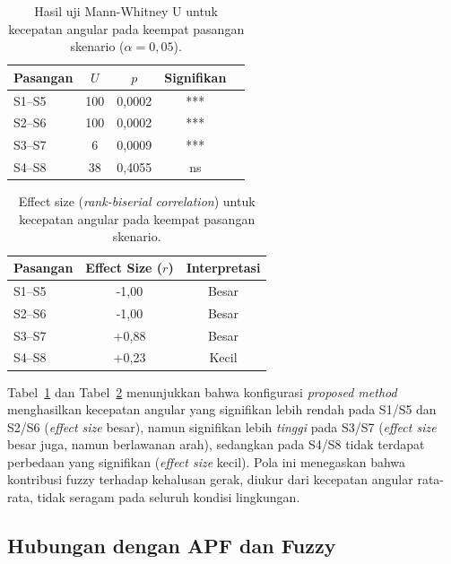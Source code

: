 \begin{table}[H]
\centering
\caption{Hasil uji Mann-Whitney U untuk kecepatan angular pada keempat
pasangan skenario ($\alpha=0,05$).}
\label{tab:angvel_mwu}
\begin{tabular}{lcccc}
\toprule
\textbf{Pasangan} & \textbf{$U$} & \textbf{$p$} & \textbf{Signifikan} \\
\midrule
S1--S5 & 100 & 0,0002 & *** \\
S2--S6 & 100 & 0,0002 & *** \\
S3--S7 & 6   & 0,0009 & *** \\
S4--S8 & 38  & 0,4055 & ns  \\
\bottomrule
\end{tabular}
\end{table}

\begin{table}[H]
\centering
\caption{Effect size (\textit{rank-biserial correlation}) untuk kecepatan
angular pada keempat pasangan skenario.}
\label{tab:angvel_effect_size}
\begin{tabular}{lcc}
\toprule
\textbf{Pasangan} & \textbf{Effect Size ($r$)} & \textbf{Interpretasi} \\
\midrule
S1--S5 & -1,00 & Besar \\
S2--S6 & -1,00 & Besar \\
S3--S7 & +0,88 & Besar \\
S4--S8 & +0,23 & Kecil \\
\bottomrule
\end{tabular}
\end{table}

Tabel~\ref{tab:angvel_mwu} dan Tabel~\ref{tab:angvel_effect_size}
menunjukkan bahwa konfigurasi \textit{proposed method} menghasilkan
kecepatan angular yang signifikan lebih rendah pada S1/S5 dan S2/S6
(\textit{effect size} besar), namun signifikan lebih \textit{tinggi} pada
S3/S7 (\textit{effect size} besar juga, namun berlawanan arah), sedangkan
pada S4/S8 tidak terdapat perbedaan yang signifikan (\textit{effect size}
kecil). Pola ini menegaskan bahwa kontribusi fuzzy terhadap kehalusan gerak,
diukur dari kecepatan angular rata-rata, tidak seragam pada seluruh kondisi
lingkungan.

\subsection{Hubungan dengan APF dan Fuzzy}

